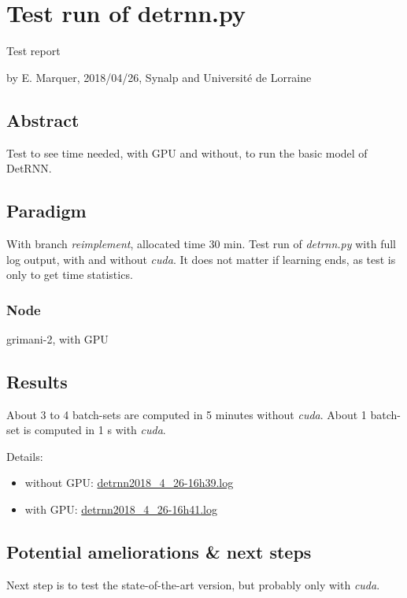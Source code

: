 \section*{Test run of detrnn.py}

Test report

by E. Marquer, 2018/04/26, Synalp and Université de Lorraine

\subsection{Abstract}

Test to see time needed, with GPU and without, to run the basic model of
DetRNN.

\subsection{Paradigm}

With branch \emph{reimplement}, allocated time 30 min. Test run of
\emph{detrnn.py} with full log output, with and without \emph{cuda}. It
does not matter if learning ends, as test is only to get time
statistics.

\subsubsection{Node}

grimani-2, with GPU

\subsection{Results}

About 3 to 4 batch-sets are computed in 5 minutes without \emph{cuda}.
About 1 batch-set is computed in 1 s with \emph{cuda}.

Details:
\begin{itemize}
	\item without GPU: \href{https://gitlab.inria.fr/emarquer/awd-lstm-lm/blob/reimplement/logs/detrnn2018_4_26-16h39.log}{detrnn2018\_4\_26-16h39.log}
	\item with GPU: \href{https://gitlab.inria.fr/emarquer/awd-lstm-lm/blob/reimplement/logs/detrnn2018_4_26-16h41.log}{detrnn2018\_4\_26-16h41.log}
\end{itemize}

\subsection{Potential ameliorations \& next steps}

Next step is to test the state-of-the-art version, but probably only
with \emph{cuda}.

